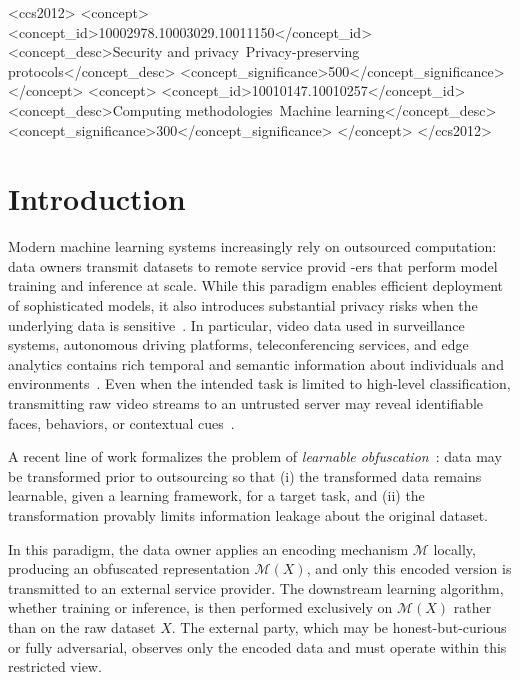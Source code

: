 \documentclass[sigconf,anonymous, review]{acmart}
\begin{document}
\begin{CCSXML}
<ccs2012>
 <concept>
  <concept_id>10002978.10003029.10011150</concept_id>
  <concept_desc>Security and privacy~Privacy-preserving protocols</concept_desc>
  <concept_significance>500</concept_significance>
 </concept>
 <concept>
  <concept_id>10010147.10010257</concept_id>
  <concept_desc>Computing methodologies~Machine learning</concept_desc>
  <concept_significance>300</concept_significance>
 </concept>
</ccs2012>
\end{CCSXML}



\maketitle

\section{Introduction}

Modern machine learning systems increasingly rely on outsourced computation: data owners transmit datasets to remote service provid -ers that perform model training and inference at scale. While this paradigm enables efficient deployment of sophisticated models, it also introduces substantial privacy risks when the underlying data is sensitive~\cite{shan2018practical}. In particular, video data used in surveillance systems, autonomous driving platforms, teleconferencing services, and edge analytics contains rich temporal and semantic information about individuals and environments~\cite{zhou2019discovering}. Even when the intended task is limited to high-level classification, transmitting raw video streams to an untrusted server may reveal identifiable faces, behaviors, or contextual cues~\cite{yu2018pinto}.

A recent line of work formalizes the problem of \emph{learnable obfuscation}~\cite{christiano2024backdoor}: data may be transformed prior to outsourcing so that (i) the transformed data remains learnable, given a learning framework, for a target task, and (ii) the transformation provably limits information leakage about the original dataset.

In this paradigm, the data owner applies an encoding mechanism $\mathcal{M}$ locally, producing an obfuscated representation $\mathcal{M}(X)$, and only this encoded version is transmitted to an external service provider. The downstream learning algorithm, whether training or inference, is then performed exclusively on $\mathcal{M}(X)$ rather than on the raw dataset $X$. The external party, which may be honest-but-curious or fully adversarial, observes only the encoded data and must operate within this restricted view.
\end{document}
